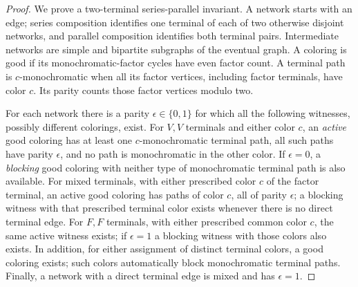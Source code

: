 \begin{proof}
We prove a two-terminal series-parallel invariant. A network starts with
an edge; series composition identifies one terminal of each of two
otherwise disjoint networks, and parallel composition identifies both
terminal pairs. Intermediate networks are simple and bipartite subgraphs
of the eventual graph. A coloring is good if its monochromatic-factor
cycles have even factor count. A terminal path is $c$-monochromatic when
all its factor vertices, including factor terminals, have color $c$.
Its parity counts those factor vertices modulo two.

For each network there is a parity $\epsilon\in\{0,1\}$ for which all
the following witnesses, possibly different colorings, exist. For $V,V$ terminals and either color $c$, an \emph{active} good coloring
has at least one $c$-monochromatic terminal path, all such paths have
parity $\epsilon$, and no path is monochromatic in the other color.
If $\epsilon=0$, a \emph{blocking} good coloring with neither type of
monochromatic terminal path is also available. For mixed terminals,
with either prescribed color $c$ of the factor terminal, an active good
coloring has paths of color $c$, all of parity $\epsilon$; a blocking
witness with that prescribed terminal color exists whenever there
is no direct terminal edge. For $F,F$ terminals, with either prescribed
common color $c$, the same active witness exists; if $\epsilon=1$ a
blocking witness with those colors also exists. In addition, for either
assignment of distinct terminal colors, a good coloring exists; such
colors automatically block monochromatic terminal paths. Finally, a
network with a direct terminal edge is mixed and has $\epsilon=1$.


\end{proof}
